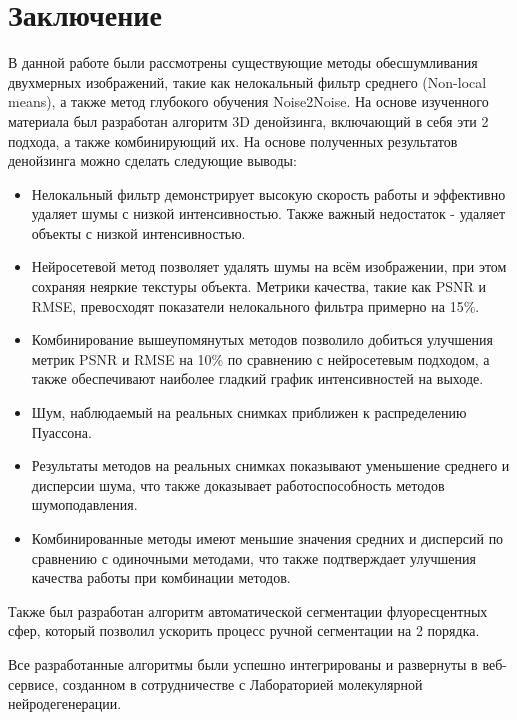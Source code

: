 \chapter*{Заключение} \label{ch-conclusion}
\par В данной работе были рассмотрены существующие методы обесшумливания двухмерных изображений, такие как нелокальный фильтр среднего (Non-local means), а также метод глубокого обучения Noise2Noise. На основе изученного материала был разработан алгоритм 3D денойзинга, включающий в себя эти 2 подхода, а также комбинирующий их. На основе полученных результатов денойзинга можно сделать следующие выводы:
\begin{itemize}[]
	\item Нелокальный фильтр демонстрирует высокую скорость работы и эффективно удаляет шумы с низкой интенсивностью. Также важный недостаток - удаляет объекты с низкой интенсивностью.
	\item Нейросетевой метод позволяет удалять шумы на всём изображении, при этом сохраняя неяркие текстуры объекта. Метрики качества, такие как PSNR и RMSE, превосходят показатели нелокального фильтра примерно  на 15\%.
	\item Комбинирование вышеупомянутых методов позволило добиться улучшения метрик PSNR и RMSE на 10\% по сравнению с нейросетевым подходом, а также обеспечивают наиболее гладкий график интенсивностей на выходе.
	\item Шум, наблюдаемый на реальных снимках приближен к распределению Пуассона.
	\item Результаты методов на реальных снимках показывают уменьшение среднего и дисперсии шума, что также доказывает работоспособность методов шумоподавления.
	\item Комбинированные методы имеют меньшие значения средних и дисперсий по сравнению с одиночными методами, что также подтверждает улучшения качества работы при комбинации методов.
\end{itemize}
\par Также был разработан алгоритм автоматической сегментации флуоресцентных сфер, который позволил ускорить процесс ручной сегментации на 2 порядка.
\par Все разработанные алгоритмы были успешно интегрированы и развернуты в веб-сервисе, созданном в сотрудничестве с Лабораторией молекулярной нейродегенерации. 